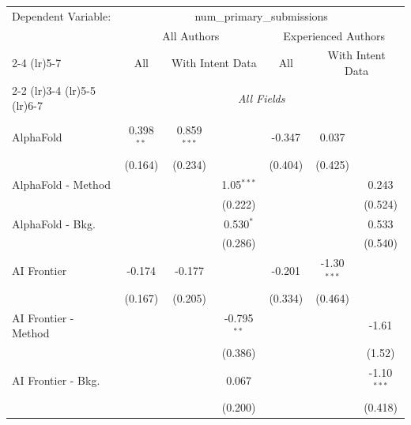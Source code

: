 \begingroup
\centering
\begin{tabular}{lcccccc}
   \tabularnewline \midrule \midrule
   Dependent Variable: & \multicolumn{6}{c}{num\_primary\_submissions}\\
 & \multicolumn{3}{c}{All Authors} & \multicolumn{3}{c}{Experienced Authors} \\
\cmidrule(lr){2-4} \cmidrule(lr){5-7}
 & \multicolumn{1}{c}{All} & \multicolumn{2}{c}{With Intent Data} & \multicolumn{1}{c}{All} & \multicolumn{2}{c}{With Intent Data} \\
\cmidrule(lr){2-2} \cmidrule(lr){3-4} \cmidrule(lr){5-5} \cmidrule(lr){6-7}
 & \multicolumn{6}{c}{\textit{All Fields}} \\ \\
   AlphaFold            & 0.398$^{**}$ & 0.859$^{***}$ &               & -0.347      & 0.037         &   \\   
                        & (0.164)      & (0.234)       &               & (0.404)     & (0.425)       &   \\   
   AlphaFold - Method   &              &               & 1.05$^{***}$  &             &               & 0.243\\   
                        &              &               & (0.222)       &             &               & (0.524)\\   
   AlphaFold - Bkg.     &              &               & 0.530$^{*}$   &             &               & 0.533\\   
                        &              &               & (0.286)       &             &               & (0.540)\\   
   AI Frontier          & -0.174       & -0.177        &               & -0.201      & -1.30$^{***}$ &   \\   
                        & (0.167)      & (0.205)       &               & (0.334)     & (0.464)       &   \\   
   AI Frontier - Method &              &               & -0.795$^{**}$ &             &               & -1.61\\   
                        &              &               & (0.386)       &             &               & (1.52)\\   
   AI Frontier - Bkg.   &              &               & 0.067         &             &               & -1.10$^{***}$\\   
                        &              &               & (0.200)       &             &               & (0.418)\\   

\end{tabular}
